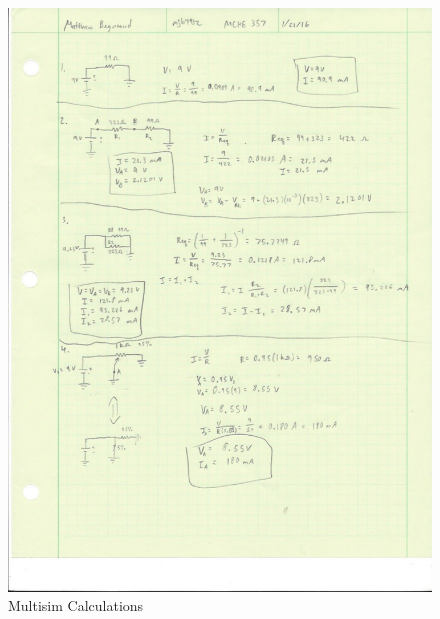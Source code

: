 \documentclass[12pt]{article}
\begin{document}
\begin{figure}[h!] %
   \centering
   \includegraphics[width=6in]{Multisim_calculations.pdf} 
   \caption{Multisim Calculations}
   \label{fig:example}
\end{figure}

\newpage
\end{document}
